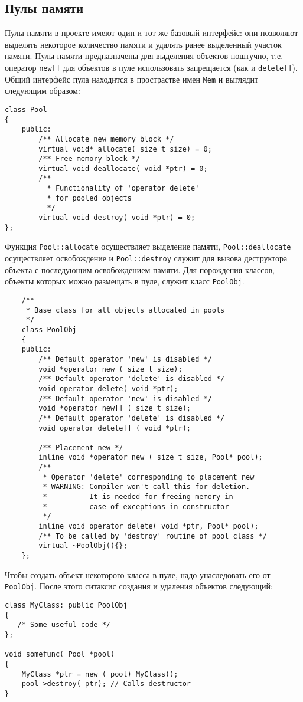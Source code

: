 \documentclass{article}
\begin{document}
\subsection{Пулы памяти}
Пулы памяти в проекте имеют один и тот же базовый интерфейс: они позволяют выделять некоторое количество памяти и удалять ранее выделенный участок памяти. Пулы памяти предназначены для выделения объектов поштучно, т.е. оператор \lstinline{new[]} для объектов в пуле использовать запрещается (как и \lstinline{delete[]}).
Общий интерфейс пула находится в прострастве имен \lstinline{Mem} и выглядит следующим образом:
\begin{lstlisting}
class Pool
{
    public:
        /** Allocate new memory block */
        virtual void* allocate( size_t size) = 0;
        /** Free memory block */
        virtual void deallocate( void *ptr) = 0;
        /** 
          * Functionality of 'operator delete'
          * for pooled objects
          */
        virtual void destroy( void *ptr) = 0;
};
\end{lstlisting}
Функция \lstinline{Pool::allocate} осуществляет выделение памяти, \lstinline{Pool::deallocate} осуществляет освобождение и \lstinline{Pool::destroy} служит для вызова деструктора объекта с последующим освобождением памяти. Для порождения классов, объекты которых можно размещать в пуле, служит класс \lstinline{PoolObj}.
\begin{lstlisting}
    /**
     * Base class for all objects allocated in pools
     */    
    class PoolObj
    {
    public:
        /** Default operator 'new' is disabled */
        void *operator new ( size_t size);
        /** Default operator 'delete' is disabled */
        void operator delete( void *ptr);
        /** Default operator 'new' is disabled */
        void *operator new[] ( size_t size);
        /** Default operator 'delete' is disabled */
        void operator delete[] ( void *ptr);
        
        /** Placement new */
        inline void *operator new ( size_t size, Pool* pool);
        /**
         * Operator 'delete' corresponding to placement new
         * WARNING: Compiler won't call this for deletion. 
         *          It is needed for freeing memory in  
         *          case of exceptions in constructor
         */
        inline void operator delete( void *ptr, Pool* pool);
        /** To be called by 'destroy' routine of pool class */
        virtual ~PoolObj(){};
    };
\end{lstlisting}
Чтобы создать объект некоторого класса в пуле, надо унаследовать его от \lstinline{PoolObj}. После этого ситаксис создания и удаления объектов следующий:
\begin{lstlisting}
class MyClass: public PoolObj
{
   /* Some useful code */        
};

void somefunc( Pool *pool)
{
    MyClass *ptr = new ( pool) MyClass();
    pool->destroy( ptr); // Calls destructor
}
\end{lstlisting}
\end{document}
